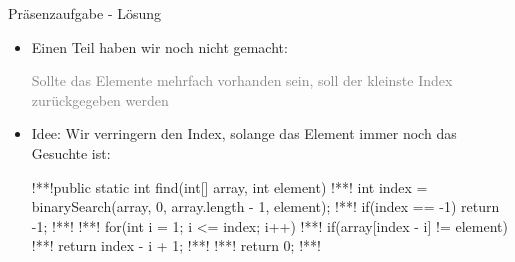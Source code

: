 \begin{frame}[fragile]{Präsenzaufgabe - Lösung}
\begin{itemize}[<+(1)->]
    \itemsep6.5pt
    \item Einen Teil haben wir noch nicht gemacht:\pause \begin{center}
        \parbox{.725\linewidth}{\textcolor{gray}{Sollte das Elemente mehrfach vorhanden sein, soll der kleinste Index zurückgegeben werden}}
    \end{center}
    \item Idee: Wir verringern den Index, solange das Element immer noch das Gesuchte ist:
\SetupLstHl{}\begin{plainjava}
!**!public static int find(int[] array, int element) {
!**!    int index = binarySearch(array, 0, array.length - 1, element);
!**!    if(index == -1) return -1;
!**!
!**!    for(int i = 1; i <= index; i++) {
!**!        if(array[index - i] != element)
!**!            return index - i + 1;
!**!    }
!**!    return 0;
!**!}
\end{plainjava}
\end{itemize}
\end{frame}

